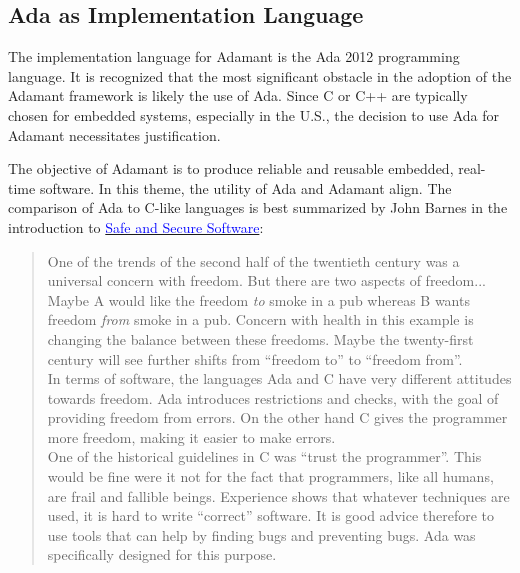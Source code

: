 \subsection{Ada as Implementation Language}

The implementation language for Adamant is the Ada 2012 programming language. It is recognized that the most significant obstacle in the adoption of the Adamant framework is likely the use of Ada. Since C or C++ are typically chosen for embedded systems, especially in the U.S., the decision to use Ada for Adamant necessitates justification.

The objective of Adamant is to produce reliable and reusable embedded, real-time software. In this theme, the utility of Ada and Adamant align. The comparison of Ada to C-like languages is best summarized by John Barnes in the introduction to \href{https://www.adacore.com/uploads/books/pdf/SafeSecureAdav2015-covered.pdf}{\textcolor{blue}{Safe and Secure Software}}:

\vspace{5mm} %
\begin{quote}
One of the trends of the second half of the twentieth century was a universal
concern with freedom. But there are two aspects of freedom... Maybe A would like the freedom \textit{to} smoke in a pub
whereas B wants freedom \textit{from} smoke in a pub. Concern with health in this
example is changing the balance between these freedoms. Maybe the twenty-first century will see further shifts from “freedom to” to “freedom from”. \\

In terms of software, the languages Ada and C have very different attitudes towards
freedom. Ada introduces restrictions and checks, with the goal of providing
freedom from errors. On the other hand C gives the programmer more freedom,
making it easier to make errors. \\

One of the historical guidelines in C was “trust the programmer”. This would
be fine were it not for the fact that programmers, like all humans, are frail and
fallible beings. Experience shows that whatever techniques are used, it is hard to
write “correct” software. It is good advice therefore to use tools that can help by
finding bugs and preventing bugs. Ada was specifically designed for this
purpose. 
\end{quote}
\vspace{5mm} %

